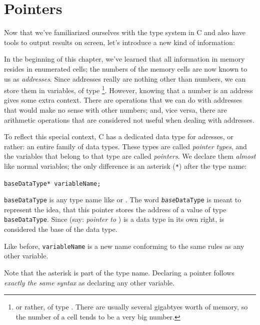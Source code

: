 {{{{\section{Pointers}
Now that we've familiarized ourselves with the type system in C and also have tools to output results on screen, let's introduce a new kind of information:

In the beginning of this chapter, we've learned that all information in memory resides in enumerated cells; the numbers of the memory cells are now known to us as \emph{addresses}. Since addresses really are nothing other than numbers, we can store them in variables, \eg of type \footnote{or rather, of type . There are usually several gigabtyes worth of memory, so the number of a cell tends to be a very big number.}. However, knowing that a number is an address gives some extra context. There are operations that we can do with addresses that would make no sense with other numbers; and, vice versa, there are arithmetic operations that are considered not useful when dealing with addresses.

To reflect this special context, C has a dedicated data type for adresses, or rather: an entire family of data types. These types are called \emph{pointer types}, and the variables that belong to that type are called \emph{pointers}. We declare them \emph{almost} like normal variables; the only difference is an asterisk (\texttt{*}) after the type name:

\begin{codebox}
\texttt{baseDataType* variableName;}
\end{codebox}

\texttt{baseDataType} is any type name like  or . The word \texttt{\emph{base}DataType} is meant to represent the idea, that this pointer stores the address of a value of type \texttt{baseDataType}. Since  (say: \emph{pointer to }) is a data type in its own right,  is considered the base of the data type.

Like before, \texttt{variableName} is a new name conforming to the same rules as any other variable.

\begin{defbox}
Note that the asterisk is part of the type name. Declaring a pointer follows \emph{exactly the same syntax} as declaring any other variable.

\begin{center}
\begin{tikzpicture}
  [
    cell/.style={text width=8mm,
      text height=4mm, draw=black, inner sep=1mm},
    ld/.style={draw=blue,shorten >=2pt,->}
  ]
  

\end{tikzpicture}
\end{center}
\end{defbox}}}}}

